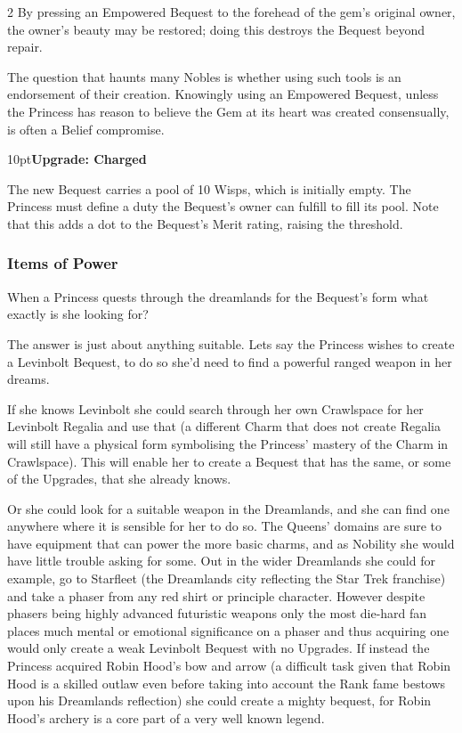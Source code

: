 \begin{multicols}{2}
By pressing an Empowered Bequest to the forehead of the gem's original owner, the owner's beauty may be restored; doing this destroys the Bequest beyond repair.

The question that haunts many Nobles is whether using such tools is an endorsement of their creation. Knowingly using an Empowered Bequest, unless the Princess has reason to believe the Gem at its heart was created consensually, is often a Belief compromise.

\begin{myindentpar}{10pt}\textbf{Upgrade: Charged}

The new Bequest carries a pool of 10 Wisps, which is initially empty. The Princess must define a duty the Bequest's owner can fulfill to fill its pool. Note that this adds a dot to the Bequest's Merit rating, raising the threshold.

\end{myindentpar} 

\bigsidebarstart



\subsubsection*{Items of Power}

When a Princess quests through the dreamlands for the Bequest's form what exactly is she looking for? 

The answer is just about anything suitable. Lets say the Princess wishes to create a Levinbolt Bequest, to do so she'd need to find a powerful ranged weapon in her dreams. 

If she knows Levinbolt she could search through her own Crawlspace for her Levinbolt Regalia and use that (a different Charm that does not create Regalia will still have a physical form symbolising the Princess' mastery of the Charm in Crawlspace). This will enable her to create a Bequest that has the same, or some of the Upgrades, that she already knows. 

Or she could look for a suitable weapon in the Dreamlands, and she can find one anywhere where it is sensible for her to do so. The Queens' domains are sure to have equipment that can power the more basic charms, and as Nobility she would have little trouble asking for some. Out in the wider Dreamlands she could for example, go to Starfleet (the Dreamlands city reflecting the Star Trek franchise) and take a phaser from any red shirt or principle character. However despite phasers being highly advanced futuristic weapons only the most die-hard fan places much mental or emotional significance on a phaser and thus acquiring one would only create a weak Levinbolt Bequest with no Upgrades. If instead the Princess acquired Robin Hood's bow and arrow (a difficult task given that Robin Hood is a skilled outlaw even before taking into account the Rank fame bestows upon his Dreamlands reflection) she could create a mighty bequest, for Robin Hood's archery is a core part of a very well known legend. 


\end{multicols}
